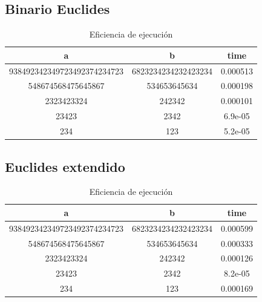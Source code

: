 \subsection{Binario Euclides}
\begin{table}[H]
\label{tablax}
\begin{center}
\begin{tabular}{|c|c|c|}
\hline 
a&b&time \\
\hline
938492342349723492374234723&6823234234232423234&0.000513\\\hline
548674568475645867&534653645634&0.000198\\\hline
2323423324&242342&0.000101\\\hline
23423&2342&6.9e-05\\\hline
234&123&5.2e-05\\\hline
\end{tabular}
\end{center}
\caption{Eficiencia de ejecuci\'on}
\end{table}


\subsection{Euclides extendido}
\begin{table}[!h]
\label{tablax}
\begin{center}
\begin{tabular}{|c|c|c|}
\hline 
a&b&time \\
\hline
938492342349723492374234723&6823234234232423234&0.000599\\\hline
548674568475645867&534653645634&0.000333\\\hline
2323423324&242342&0.000126\\\hline
23423&2342&8.2e-05\\\hline
234&123&0.000169\\\hline
\end{tabular}
\end{center}
\caption{Eficiencia de ejecuci\'on}
\end{table}







